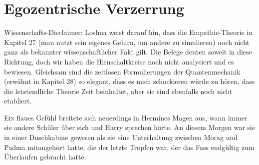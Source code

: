 \chapter{Egozentrische Verzerrung}

\begin{chapterOpeningAuthorNote}
% 
Wissenschafts-Disclaimer: Loshua weist darauf hin, dass die Empathie-Theorie in Kapitel 27 (man nutzt sein eigenes Gehirn, um andere zu simulieren) noch nicht ganz als bekannter wissenschaftlicher Fakt gilt. Die Belege deuten soweit in diese Richtung, doch wir haben die Hirnschaltkreise noch nicht analysiert und es bewiesen. Gleichsam sind die zeitlosen Formulierungen der Quantenmechanik (erwähnt in Kapitel 28) so elegant, dass es mich schockieren würde zu hören, dass die letztendliche Theorie Zeit beinhaltet, aber sie sind ebenfalls noch nicht etabliert.
\end{chapterOpeningAuthorNote}

\lettrine{E}{in} flaues Gefühl breitete sich neuerdings in Hermines Magen aus, wann immer sie andere Schüler über sich und Harry sprechen hörte. An diesem Morgen war sie in einer Duschkabine gewesen als sie eine Unterhaltung zwischen Morag und Padma mitangehört hatte, die der letzte Tropfen war, der das Fass endgültig zum Überlaufen gebracht hatte.

